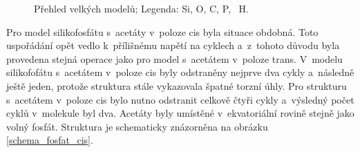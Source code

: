 \documentclass[
digital, %
table,   %
nolof,     %
nolot,     %
oneside,
]{fithesis3}
\begin{document}
\begin{figure}
\begin{center}
\caption{Přehled velkých modelů;  Legenda:  Si,  O,  C,  P, ~H.}
\label{prehled_largeI}
\end{center}
\end{figure}
Pro model silikofosfátu s~acetáty v~poloze cis byla situace obdobná. Toto uspořádání opět vedlo k~přílišnému napětí na cyklech a~z~tohoto důvodu byla provedena stejná operace jako pro model s~acetátem v~poloze trans. V~modelu silikofofátu s~acetátem v~poloze cis byly odstraněny nejprve dva cykly a~následně ještě jeden, protože struktura stále vykazovala špatné torzní úhly.
Pro strukturu s~acetátem v~poloze cis bylo nutno odstranit celkově čtyři cykly a~výsledný počet cyklů v~molekule byl dva. Acetáty byly umístěné v~ekvatoriální rovině stejně jako volný fosfát. Struktura je schematicky znázorněna na obrázku \ref{schema_fosfat_cis}. \\
\end{document}
